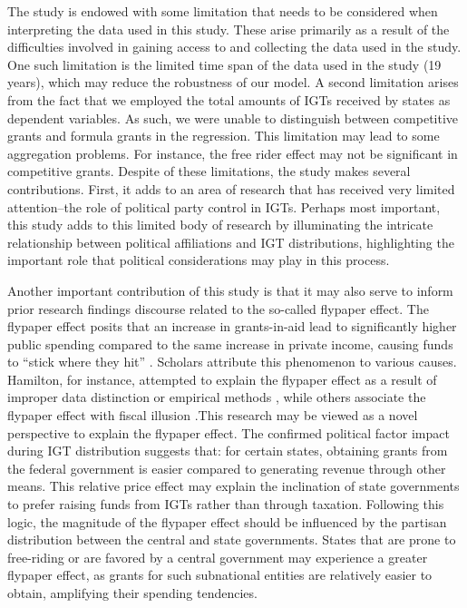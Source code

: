 The study is endowed with some limitation that needs to be considered when interpreting the data used in this study. These arise primarily as a result of the difficulties involved in gaining access to and collecting the data used in the study. One such limitation is the limited time span of the data used in the study (19 years), which may reduce the robustness of our model. A second limitation arises from the fact that we employed the total amounts of IGTs received by states as dependent variables. As such, we were unable to distinguish between competitive grants and formula grants in the regression. This limitation may lead to some aggregation problems. For instance, the free rider effect may not be significant in competitive grants. Despite of these limitations, the study makes several contributions. First, it adds to an area of research that has received very limited attention--the role of political party control in IGTs. Perhaps most important, this study adds to this limited
body of research by illuminating the intricate relationship between political affiliations and IGT distributions, highlighting the important role that political considerations may play in this process.


Another important contribution of this study is that it may also serve to inform prior research findings discourse related to the so-called flypaper effect. The flypaper effect posits that an increase in grants-in-aid lead to significantly higher public spending compared to the same increase in
private income, causing funds to “stick where they hit” \parencite{inman2008flypaper}. Scholars attribute this phenomenon to various causes. Hamilton, for instance, attempted to explain the flypaper effect as a result of improper data distinction or empirical methods \parencite{hamilton1986flypaper}, while others associate the flypaper effect with fiscal illusion \parencite{gramlich1997stimulative}.This research may be viewed as a novel perspective to explain the flypaper effect. The confirmed political factor impact during IGT distribution suggests that: for certain states, obtaining grants from the federal government is easier
compared to generating revenue through other means. This relative price effect may explain the inclination of state governments to prefer raising funds from IGTs rather than through taxation. Following this logic, the magnitude of the flypaper effect should be influenced by the partisan distribution between the central and state governments. States that are prone to free-riding or are
favored by a central government may experience a greater flypaper effect, as grants for such subnational entities are relatively easier to obtain, amplifying their spending tendencies.